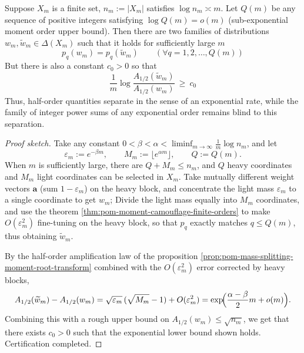 \begin{theorem}\label{thm:pom-subexp-moments-blindspot-half}
Suppose \(X_m\) is a finite set, \(n_m:=|X_m|\) satisfies \(\log n_m\asymp m\).
Let \(Q(m)\) be any sequence of positive integers satisfying \(\log Q(m)=o(m)\) (sub-exponential moment order upper bound).
Then there are two families of distributions \(w_m,\widetilde w_m\in\Delta(X_m)\) such that it holds for sufficiently large \(m\)
\[
\boxed{\;
p_q(w_m)=p_q(\widetilde w_m)\qquad(\forall q=1,2,\dots,Q(m))\;}
\]
But there is also a constant \(c_0>0\) so that
\[
\boxed{\;
\frac{1}{m}\log\frac{A_{1/2}(\widetilde w_m)}{A_{1/2}(w_m)}\ \ge\ c_0\;}
\]
Thus, half-order quantities separate in the sense of an exponential rate, while the family of integer power sums of any exponential order remains blind to this separation.
\end{theorem}
\begin{proof}[Proof sketch]
Take any constant \(0<\beta<\alpha<\liminf_{m\to\infty}\frac{1}{m}\log n_m\), and let
\[
\varepsilon_m:=e^{-\beta m},\qquad M_m:=\bigl\lfloor e^{\alpha m}\bigr\rfloor,
\qquad Q:=Q(m).
\]
When \(m\) is sufficiently large, there are \(Q+M_m\le n_m\), and \(Q\) heavy coordinates and \(M_m\) light coordinates can be selected in \(X_m\).
Take mutually different weight vectors \(\mathbf a\) (sum \(1-\varepsilon_m\)) on the heavy block, and concentrate the light mass \(\varepsilon_m\) to a single coordinate to get \(w_m\);
Divide the light mass equally into \(M_m\) coordinates, and use the theorem \ref{thm:pom-moment-camouflage-finite-orders} to make \(O(\varepsilon_m^2)\) fine-tuning on the heavy block, so that \(p_q\) exactly matches \(q\le Q(m)\), thus obtaining \(\widetilde w_m\).
\par
By the half-order amplification law of the proposition \ref{prop:pom-mass-splitting-moment-root-transform} combined with the \(O(\varepsilon_m^2)\) error corrected by heavy blocks,
\[
A_{1/2}(\widetilde w_m)-A_{1/2}(w_m)
=\sqrt{\varepsilon_m}\,(\sqrt{M_m}-1)+O(\varepsilon_m^2)
=\exp\!\Bigl(\frac{\alpha-\beta}{2}m+o(m)\Bigr).
\]
Combining this with a rough upper bound on \(A_{1/2}(w_m)\le \sqrt{n_m}\), we get that there exists \(c_0>0\) such that the exponential lower bound shown holds. Certification completed.
\end{proof}

